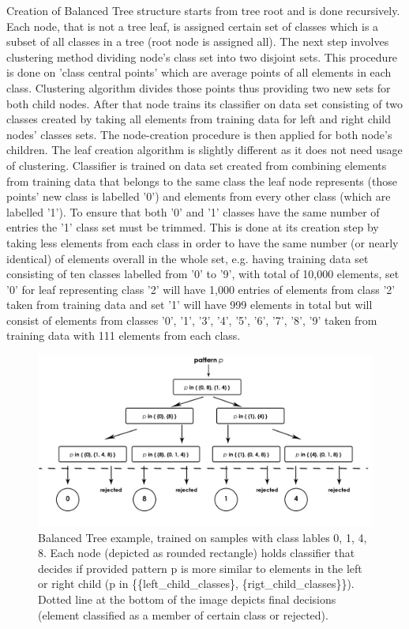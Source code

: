 Creation of Balanced Tree structure starts from tree root and is done recursively. Each node, that is not a tree leaf, is assigned certain set of classes which is a subset of all classes in a tree (root node is assigned all). The next step involves clustering method dividing node's class set into two disjoint sets. This procedure is done on 'class central points' which are average points of all elements in each class. Clustering algorithm divides those points thus providing two new sets for both child nodes. After that node trains its classifier on data set consisting of two classes created by taking all elements from training data for left and right child nodes' classes sets. The node-creation procedure is then applied for both node's children. The leaf creation algorithm is slightly different as it does not need usage of clustering. Classifier is trained on data set created from combining elements from training data that belongs to the same class the leaf node represents (those points' new class is labelled '0') and elements from every other class (which are labelled '1')\label{balanced_tree:one-vs-rest}. To ensure that both '0' and '1' classes have the same number of entries the '1' class set must be trimmed. This is done at its creation step by taking less elements from each class in order to have the same number (or nearly identical) of elements overall in the whole set, e.g. having training data set consisting of ten classes labelled from '0' to '9', with total of 10,000 elements, set '0' for leaf representing class '2' will have 1,000 entries of elements from class '2' taken from training data and set '1' will have 999 elements in total but will consist of elements from classes '0', '1', '3', '4', '5', '6', '7', '8', '9' taken from training data with 111 elements from each class.

\begin{figure}[!t]
	\centering
	\includegraphics[width=1\textwidth]{Figures/balanced_tree.jpg}
	\caption{Balanced Tree example, trained on samples with class lables 0, 1, 4, 8. Each node (depicted as rounded rectangle) holds classifier that decides if provided pattern p is more similar to elements in the left or right child (p in \{\{left\_child\_classes\}, \{rigt\_child\_classes\}\}). Dotted line at the bottom of the image depicts final decisions (element classified as a member of certain class or rejected).}
	\label{fig:rejection_version1}\vspace{-3pt}
\end{figure}

